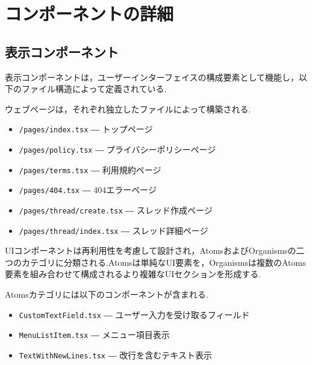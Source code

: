 \documentclass[b5paper,12pt,dvipdfmx]{jsreport}
\begin{document}


\section{コンポーネントの詳細}


\subsection*{表示コンポーネント}

表示コンポーネントは，ユーザーインターフェイスの構成要素として機能し，以下のファイル構造によって定義されている.

ウェブページは，それぞれ独立したファイルによって構築される.

\begin{itemize}
\item \texttt{/pages/index.tsx} ― トップページ
\item \texttt{/pages/policy.tsx} ― プライバシーポリシーページ
\item \texttt{/pages/terms.tsx} ― 利用規約ページ
\item \texttt{/pages/404.tsx} ― 404エラーページ
\item \texttt{/pages/thread/create.tsx} ― スレッド作成ページ
\item \texttt{/pages/thread/index.tsx} ― スレッド詳細ページ
\end{itemize}

UIコンポーネントは再利用性を考慮して設計され，AtomsおよびOrganismsの二つのカテゴリに分類される.Atomsは単純なUI要素を，Organismsは複数のAtoms要素を組み合わせて構成されるより複雑なUIセクションを形成する.

Atomsカテゴリには以下のコンポーネントが含まれる.

\begin{itemize}
    \item \texttt{CustomTextField.tsx} ― ユーザー入力を受け取るフィールド
    \item \texttt{MenuListItem.tsx} ― メニュー項目表示
    \item \texttt{TextWithNewLines.tsx} ― 改行を含むテキスト表示
\end{itemize}
\end{document}
